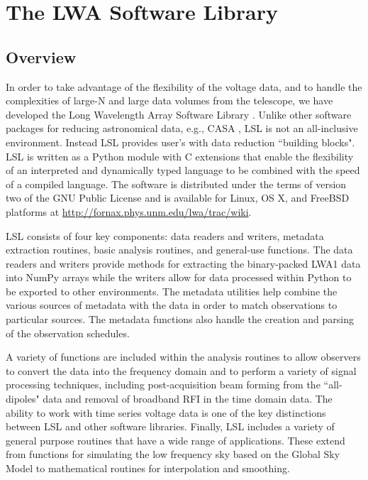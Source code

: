 \section{The LWA Software Library}
\subsection{Overview}
In order to take advantage of the flexibility of the voltage data, and to handle the complexities of large-N and large data volumes from the telescope, we have developed the Long Wavelength Array Software Library \citep[LSL;][]{LSL}.  Unlike other software packages for reducing astronomical data, e.g., CASA  \citep{CASA}, LSL is not an all-inclusive environment.  Instead LSL provides user's with data reduction ``building blocks".  LSL is written as a Python module with C extensions that enable the flexibility of an interpreted and dynamically typed language to be combined with the speed of a compiled language.  The software is distributed under the terms of version two of the GNU Public License and is available for Linux, OS X, and FreeBSD platforms at \url{http://fornax.phys.unm.edu/lwa/trac/wiki}.

LSL consists of four key components:  data readers and writers, metadata extraction routines, basic analysis routines, and general-use functions.  The data readers and writers provide methods for extracting the binary-packed LWA1 data into NumPy \citep{Numpy} arrays while the writers allow for data processed within Python to be exported to other environments.  The metadata utilities help combine the various sources of metadata with the data in order to match observations to particular sources.  The metadata functions also handle the creation and parsing of the observation schedules.

A variety of functions are included within the analysis routines to allow observers to convert the data into the frequency domain and to perform a variety of signal processing techniques, including post-acquisition beam forming from the ``all-dipoles" data and removal of broadband RFI in the time domain data.  The ability to work with time series voltage data is one of the key distinctions between LSL and other software libraries.  Finally, LSL includes a variety of general purpose routines that have a wide range of applications.  These extend from functions for simulating the low frequency sky based on the Global Sky Model \citep{GSM} to mathematical routines for interpolation and smoothing. 

